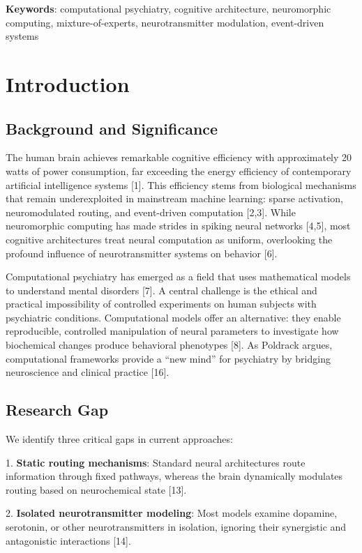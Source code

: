 \documentclass[10pt,a4paper]{article}
\begin{document}
\textbf{Keywords}: computational psychiatry, cognitive architecture, neuromorphic computing, mixture-of-experts, neurotransmitter modulation, event-driven systems

\section{Introduction}

\subsection{Background and Significance}

The human brain achieves remarkable cognitive efficiency with approximately 20 watts of power consumption, far exceeding the energy efficiency of contemporary artificial intelligence systems [1]. This efficiency stems from biological mechanisms that remain underexploited in mainstream machine learning: sparse activation, neuromodulated routing, and event-driven computation [2,3]. While neuromorphic computing has made strides in spiking neural networks [4,5], most cognitive architectures treat neural computation as uniform, overlooking the profound influence of neurotransmitter systems on behavior [6].

Computational psychiatry has emerged as a field that uses mathematical models to understand mental disorders [7]. A central challenge is the ethical and practical impossibility of controlled experiments on human subjects with psychiatric conditions. Computational models offer an alternative: they enable reproducible, controlled manipulation of neural parameters to investigate how biochemical changes produce behavioral phenotypes [8]. As Poldrack argues, computational frameworks provide a ``new mind'' for psychiatry by bridging neuroscience and clinical practice [16].

\subsection{Research Gap}

We identify three critical gaps in current approaches:

1. \textbf{Static routing mechanisms}: Standard neural architectures route information through fixed pathways, whereas the brain dynamically modulates routing based on neurochemical state [13].

2. \textbf{Isolated neurotransmitter modeling}: Most models examine dopamine, serotonin, or other neurotransmitters in isolation, ignoring their synergistic and antagonistic interactions [14].
\end{document}
